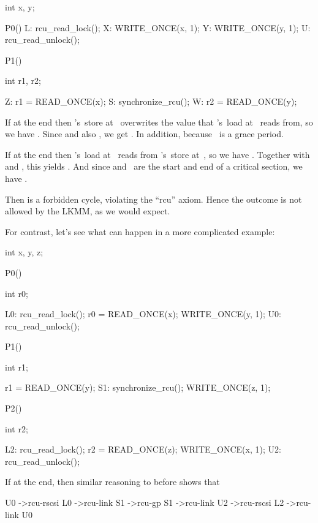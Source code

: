 \begin{VerbatimU}
	int x, y;

	P0()
	{
		L: rcu_read_lock();
		X: WRITE_ONCE(x, 1);
		Y: WRITE_ONCE(y, 1);
		U: rcu_read_unlock();
	}

	P1()
	{
		int r1, r2;

		Z: r1 = READ_ONCE(x);
		S: synchronize_rcu();
		W: r2 = READ_ONCE(y);
	}
\end{VerbatimU}

If  at the end then 's~store at~ overwrites
the value that 's~load at~ reads from, so we have
.
Since  and also , we get .
In addition,  because ~is a grace period.

If  at the end then 's~load at~ reads from
's~store at~, so we have .
Together with  and , this
yields .
And since  and~ are the start and end of a
critical section, we have .

Then  is a
forbidden cycle, violating the ``rcu'' axiom.
Hence the outcome is not allowed by the LKMM, as we would expect.

For contrast, let's see what can happen in a more complicated example:

\begin{VerbatimU}[samepage=false]
	int x, y, z;

	P0()
	{
		int r0;

		L0: rcu_read_lock();
		    r0 = READ_ONCE(x);
		    WRITE_ONCE(y, 1);
		U0: rcu_read_unlock();
	}

	P1()
	{
		int r1;

		    r1 = READ_ONCE(y);
		S1: synchronize_rcu();
		    WRITE_ONCE(z, 1);
	}

	P2()
	{
		int r2;

		L2: rcu_read_lock();
		    r2 = READ_ONCE(z);
		    WRITE_ONCE(x, 1);
		U2: rcu_read_unlock();
	}
\end{VerbatimU}

If  at the end, then similar reasoning to before shows
that

\begin{VerbatimU}[breaklines=true]
U0 ->rcu-rscsi L0 ->rcu-link S1 ->rcu-gp S1 ->rcu-link U2 ->rcu-rscsi L2 ->rcu-link U0
\end{VerbatimU}

